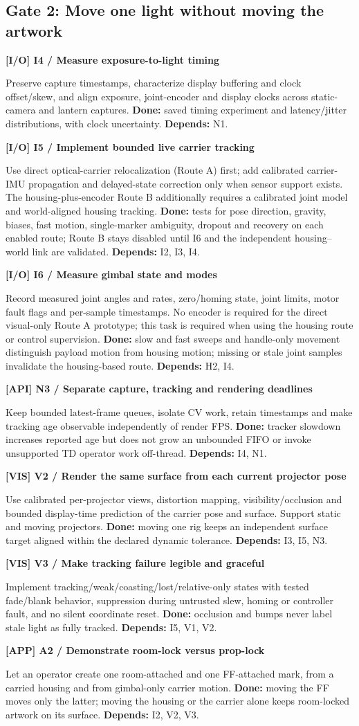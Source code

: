 \documentclass[11pt,a4paper]{article}
\newcommand{\task}[4]{%
  \begin{tcolorbox}[colback=#1!5,colframe=#1,boxrule=0.5pt,
    borderline west={2pt}{0pt}{#1}]
  \textcolor{#1}{\textbf{[#2] #3}}\par #4
  \end{tcolorbox}}
\begin{document}
\subsection{Gate 2: Move one light without moving the artwork}
\task{IO}{I/O}{I4 / Measure exposure-to-light timing}{
Preserve capture timestamps, characterize display buffering and clock
offset/skew, and align exposure, joint-encoder and display clocks across
static-camera and lantern captures.
\textbf{Done:} saved timing experiment and latency/jitter distributions,
with clock uncertainty. \textbf{Depends:} N1.}
\task{IO}{I/O}{I5 / Implement bounded live carrier tracking}{
Use direct optical-carrier relocalization (Route A) first; add calibrated
carrier-IMU propagation and delayed-state correction only when sensor
support exists. The housing-plus-encoder Route B additionally requires a
calibrated joint model and world-aligned housing tracking.
\textbf{Done:} tests for pose direction, gravity, biases, fast motion,
single-marker ambiguity, dropout and recovery on each enabled route;
Route B stays disabled until I6 and the independent housing--world link
are validated.
\textbf{Depends:} I2, I3, I4.}
\task{IO}{I/O}{I6 / Measure gimbal state and modes}{
Record measured joint angles and rates, zero/homing state, joint limits,
motor fault flags and per-sample timestamps. No encoder is required for
the direct visual-only Route A prototype; this task is required when using
the housing route or control supervision.
\textbf{Done:} slow and fast sweeps and handle-only movement distinguish
payload motion from housing motion; missing or stale joint samples
invalidate the housing-based route. \textbf{Depends:} H2, I4.}
\task{API}{API}{N3 / Separate capture, tracking and rendering deadlines}{
Keep bounded latest-frame queues, isolate CV work, retain timestamps and
make tracking age observable independently of render FPS.
\textbf{Done:} tracker slowdown increases reported age but does not grow an
unbounded FIFO or invoke unsupported TD operator work off-thread.
\textbf{Depends:} I4, N1.}
\task{VIS}{VIS}{V2 / Render the same surface from each current projector pose}{
Use calibrated per-projector views, distortion mapping, visibility/occlusion
and bounded display-time prediction of the carrier pose and surface.
Support static and moving projectors.
\textbf{Done:} moving one rig keeps an independent surface target aligned
within the declared dynamic tolerance. \textbf{Depends:} I3, I5, N3.}
\task{VIS}{VIS}{V3 / Make tracking failure legible and graceful}{
Implement tracking/weak/coasting/lost/relative-only states with tested
fade/blank behavior, suppression during untrusted slew, homing or
controller fault, and no silent coordinate reset.
\textbf{Done:} occlusion and bumps never label stale light as fully tracked.
\textbf{Depends:} I5, V1, V2.}
\task{APP}{APP}{A2 / Demonstrate room-lock versus prop-lock}{
Let an operator create one room-attached and one FF-attached mark, from a
carried housing and from gimbal-only carrier motion.
\textbf{Done:} moving the FF moves only the latter; moving the housing or
the carrier alone keeps room-locked artwork on its surface.
\textbf{Depends:} I2, V2, V3.}
\end{document}

